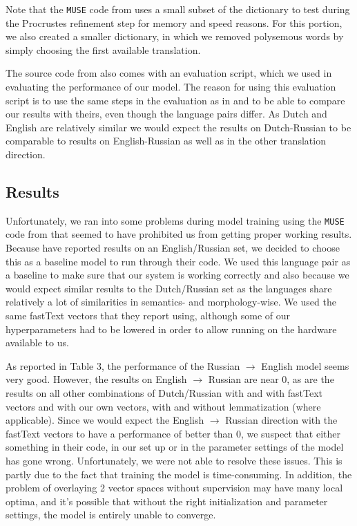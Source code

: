 \documentclass{article}
\begin{document}
Note that the \texttt{MUSE} code from \citet{conneau2017word} uses a small subset of the dictionary to test during the Procrustes refinement step for memory and speed reasons. For this portion, we also created a smaller dictionary, in which we removed polysemous words by simply choosing the first available translation.

The source code from \citet{conneau2017word} also comes with an evaluation script, which we used in evaluating the performance of our model. The reason for using this evaluation script is to use the same steps in the evaluation as in \citep{conneau2017word} and to be able to compare our results with theirs, even though the language pairs differ. As Dutch and English are relatively similar we would expect the results on Dutch-Russian to be comparable to results on English-Russian as well as in the other translation direction. 

\subsection{Results}

Unfortunately, we ran into some problems during model training using the \texttt{MUSE} code from \citet{conneau2017word} that seemed to have prohibited us from getting proper working results. Because \citet{conneau2017word} have reported results on an English/Russian set, we decided to choose this as a baseline model to run through their code. We used this language pair as a baseline to make sure that our system is working correctly and also because we would expect similar results to the Dutch/Russian set as the languages share relatively a lot of similarities in semantics- and morphology-wise. We used the same fastText vectors that they report using, although some of our hyperparameters had to be lowered in order to allow running on the hardware available to us. 

As reported in Table 3, the performance of the Russian $\rightarrow$ English model seems very good. However, the results on English $\rightarrow$ Russian are near 0, as are the results on all other combinations of Dutch/Russian with and with fastText vectors and with our own vectors, with and without lemmatization (where applicable). Since we would expect the English $\rightarrow$ Russian direction with the fastText vectors to have a performance of better than 0, we suspect that either something in their code, in our set up or in the parameter settings of the model has gone wrong. Unfortunately, we were not able to resolve these issues. This is partly due to the fact that training the model is time-consuming. In addition, the problem of overlaying 2 vector spaces without supervision may have many local optima, and it's possible that without the right initialization and parameter settings, the model is entirely unable to converge. 
\end{document}

